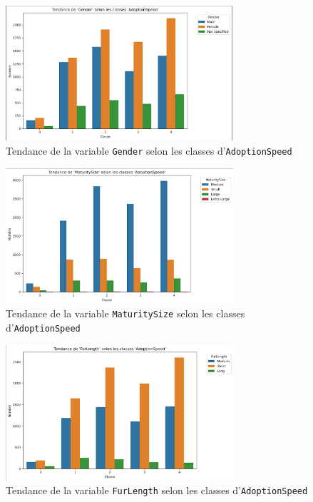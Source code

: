 \documentclass[a4paper,12pt]{article}
\begin{document}
\begin{figure}[H]
    \centering
    \includegraphics[width=0.75\textwidth]{gender_adoption_trend.png}
    \caption{Tendance de la variable \texttt{Gender} selon les classes d'\texttt{AdoptionSpeed}}
    \label{fig:gender_trend}
\end{figure}

\begin{figure}[H]
    \centering
    \includegraphics[width=0.75\textwidth]{maturitysize_adoption_trend.png}
    \caption{Tendance de la variable \texttt{MaturitySize} selon les classes d'\texttt{AdoptionSpeed}}
    \label{fig:maturitysize_trend}
\end{figure}

\begin{figure}[H]
    \centering
    \includegraphics[width=0.75\textwidth]{furlength_adoption_trend.png}
    \caption{Tendance de la variable \texttt{FurLength} selon les classes d'\texttt{AdoptionSpeed}}
    \label{fig:furlength_trend}
\end{figure}
\end{document}
